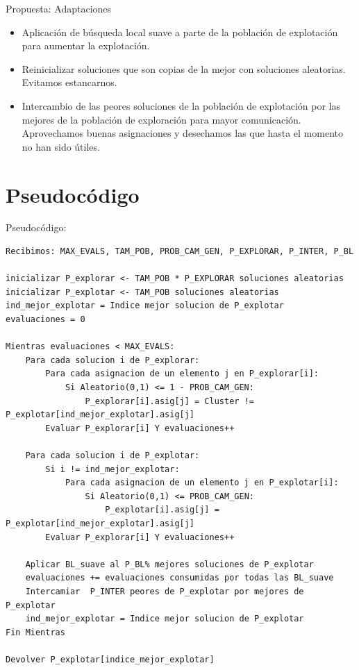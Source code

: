 \documentclass{beamer}
\begin{document}
\begin{frame}{Propuesta: Adaptaciones}

\begin{itemize}

\item Aplicación de búsqueda local suave a parte de la población de explotación para aumentar la explotación.

\item Reinicializar soluciones que son copias de la mejor con soluciones aleatorias. Evitamos estancarnos.

\item Intercambio de las peores soluciones de la población de explotación por las mejores de la población de exploración para mayor comunicación. Aprovechamos buenas asignaciones y desechamos las que hasta el momento no han sido útiles.

\end{itemize}

\end{frame}
 
 
\section{Pseudocódigo}

\begin{frame}[fragile]{Pseudocódigo:}
\tiny{
\begin{lstlisting}
Recibimos: MAX_EVALS, TAM_POB, PROB_CAM_GEN, P_EXPLORAR, P_INTER, P_BL

inicializar P_explorar <- TAM_POB * P_EXPLORAR soluciones aleatorias
inicializar P_explotar <- TAM_POB soluciones aleatorias
ind_mejor_explotar = Indice mejor solucion de P_explotar
evaluaciones = 0

Mientras evaluaciones < MAX_EVALS:
	Para cada solucion i de P_explorar:
		Para cada asignacion de un elemento j en P_explorar[i]:
			Si Aleatorio(0,1) <= 1 - PROB_CAM_GEN:
				P_explorar[i].asig[j] = Cluster != P_explotar[ind_mejor_explotar].asig[j]
		Evaluar P_explorar[i] Y evaluaciones++
		
	Para cada solucion i de P_explotar:
		Si i != ind_mejor_explotar:
			Para cada asignacion de un elemento j en P_explotar[i]:
				Si Aleatorio(0,1) <= PROB_CAM_GEN:
					P_explotar[i].asig[j] = P_explotar[ind_mejor_explotar].asig[j]
		Evaluar P_explorar[i] Y evaluaciones++
		
	Aplicar BL_suave al P_BL% mejores soluciones de P_explotar
	evaluaciones += evaluaciones consumidas por todas las BL_suave	
	Intercamiar  P_INTER peores de P_explotar por mejores de P_explotar
	ind_mejor_explotar = Indice mejor solucion de P_explotar
Fin Mientras

Devolver P_explotar[indice_mejor_explotar]

\end{lstlisting}
}

\end{frame}
  
\end{document}
